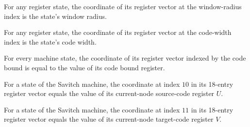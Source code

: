 \begin{lemma}
\label{Complexity.LogProg.SavitchARM.St.toV_s}
\leanok
{}
For any register state, the coordinate of its register vector at the window-radius index
is the state's window radius.
\end{lemma}

\begin{lemma}
\label{Complexity.LogProg.SavitchARM.St.toV_w}
\leanok
{}
For any register state, the coordinate of its register vector at the code-width index is
the state's code width.
\end{lemma}

\begin{lemma}
\label{Complexity.LogProg.SavitchARM.St.toV_K}
\leanok
{}
For every machine state, the coordinate of its register vector indexed by the code bound
is equal to the value of its code bound register.
\end{lemma}

\begin{lemma}
\label{Complexity.LogProg.SavitchARM.St.toV_U}
\leanok
{}
For a state of the Savitch machine, the coordinate at index $10$ in its 18-entry
register vector equals the value of its current-node source-code register $U$.
\end{lemma}

\begin{lemma}
\label{Complexity.LogProg.SavitchARM.St.toV_V}
\leanok
{}
For a state of the Savitch machine, the coordinate at index $11$ in its 18-entry
register vector equals the value of its current-node target-code register $V$.
\end{lemma}

